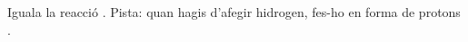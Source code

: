 \begin{exr}
Iguala la reacció . Pista: quan hagis d'afegir hidrogen, fes-ho en forma de protons .
\end{exr}
